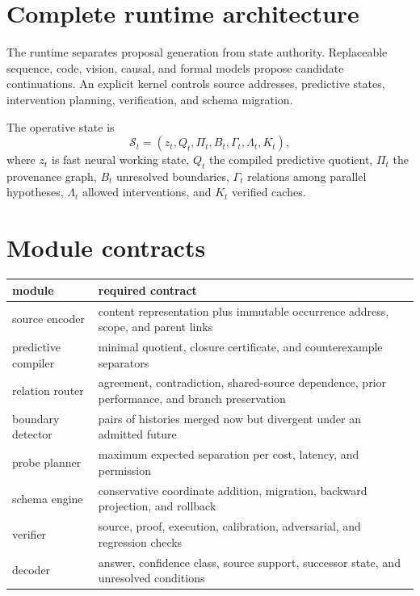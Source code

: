 \documentclass[11pt,a4paper]{article}
\begin{document}
\section{Complete runtime architecture}
The runtime separates proposal generation from state authority. Replaceable sequence, code, vision, causal, and formal models propose candidate continuations. An explicit kernel controls source addresses, predictive states, intervention planning, verification, and schema migration.

The operative state is
\begin{equation}
\mathcal S_t=(z_t,Q_t,\Pi_t,B_t,\Gamma_t,\Lambda_t,K_t),
\end{equation}
where $z_t$ is fast neural working state, $Q_t$ the compiled predictive quotient, $\Pi_t$ the provenance graph, $B_t$ unresolved boundaries, $\Gamma_t$ relations among parallel hypotheses, $\Lambda_t$ allowed interventions, and $K_t$ verified caches.

\section{Module contracts}
\begin{longtable}{p{.26\linewidth}p{.65\linewidth}}
\toprule
module&required contract\\\midrule
source encoder&content representation plus immutable occurrence address, scope, and parent links\\
predictive compiler&minimal quotient, closure certificate, and counterexample separators\\
relation router&agreement, contradiction, shared-source dependence, prior performance, and branch preservation\\
boundary detector&pairs of histories merged now but divergent under an admitted future\\
probe planner&maximum expected separation per cost, latency, and permission\\
schema engine&conservative coordinate addition, migration, backward projection, and rollback\\
verifier&source, proof, execution, calibration, adversarial, and regression checks\\
decoder&answer, confidence class, source support, successor state, and unresolved conditions\\
\bottomrule
\end{longtable}
\end{document}
